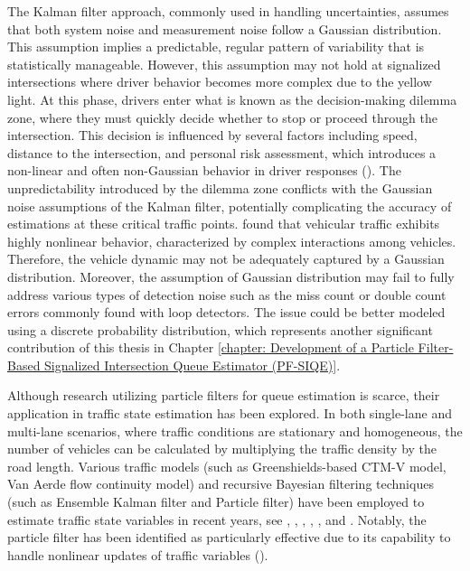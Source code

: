 The Kalman filter approach, commonly used in handling uncertainties, assumes that both system noise and measurement noise follow a Gaussian distribution. This assumption implies a predictable, regular pattern of variability that is statistically manageable. However, this assumption may not hold at signalized intersections where driver behavior becomes more complex due to the yellow light. At this phase, drivers enter what is known as the decision-making dilemma zone, where they must quickly decide whether to stop or proceed through the intersection. This decision is influenced by several factors including speed, distance to the intersection, and personal risk assessment, which introduces a non-linear and often non-Gaussian behavior in driver responses (\textcite{gates2007analysis}). The unpredictability introduced by the dilemma zone conflicts with the Gaussian noise assumptions of the Kalman filter, potentially complicating the accuracy of estimations at these critical traffic points. \textcite{helbing2001traffic} found that vehicular traffic exhibits highly nonlinear behavior, characterized by complex interactions among vehicles. Therefore, the vehicle dynamic may not be adequately captured by a Gaussian distribution. Moreover, the assumption of Gaussian distribution may fail to fully address various types of detection noise such as the miss count or double count errors commonly found with loop detectors. The issue could be better modeled using a discrete probability distribution, which represents another significant contribution of this thesis in Chapter \ref{chapter: Development of a Particle Filter-Based Signalized Intersection Queue Estimator (PF-SIQE)}.

Although research utilizing particle filters for queue estimation is scarce, their application in traffic state estimation has been explored. 
In both single-lane and multi-lane scenarios, where traffic conditions are stationary and homogeneous, the number of vehicles can be calculated by multiplying the traffic density by the road length. Various traffic models (such as Greenshields-based CTM-V model, Van Aerde flow continuity model) and recursive Bayesian filtering techniques (such as Ensemble Kalman filter and Particle filter) have been employed to estimate traffic state variables in recent years, see \textcite{wang2005real}, \textcite{mihaylova2007freeway}, \textcite{sau2007particle}, \textcite{work2008ensemble}, \textcite{cheng2006traffic}, and \textcite{chen2011real}. Notably, the particle filter has been identified as particularly effective due to its capability to handle nonlinear updates of traffic variables (\textcite{sau2007particle}).

